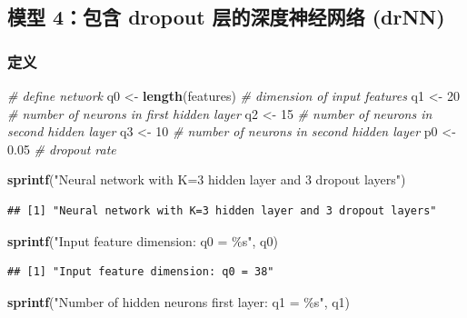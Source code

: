 \documentclass[
]{article}
\newenvironment{Shaded}{\begin{snugshade}}{\end{snugshade}}
\newcommand{\CommentTok}[1]{\textcolor[rgb]{0.56,0.35,0.01}{\textit{#1}}}
\newcommand{\DecValTok}[1]{\textcolor[rgb]{0.00,0.00,0.81}{#1}}
\newcommand{\FloatTok}[1]{\textcolor[rgb]{0.00,0.00,0.81}{#1}}
\newcommand{\FunctionTok}[1]{\textcolor[rgb]{0.13,0.29,0.53}{\textbf{#1}}}
\newcommand{\NormalTok}[1]{#1}
\newcommand{\OtherTok}[1]{\textcolor[rgb]{0.56,0.35,0.01}{#1}}
\newcommand{\StringTok}[1]{\textcolor[rgb]{0.31,0.60,0.02}{#1}}
\begin{document}
\subsection{模型 4：包含 dropout 层的深度神经网络
(drNN)}\label{ux6a21ux578b-4ux5305ux542b-dropout-ux5c42ux7684ux6df1ux5ea6ux795eux7ecfux7f51ux7edc-drnn}

\subsubsection{定义}\label{ux5b9aux4e49-3}

\begin{Shaded}
\begin{Highlighting}[]
\CommentTok{\# define network}
\NormalTok{q0 }\OtherTok{\textless{}{-}} \FunctionTok{length}\NormalTok{(features)  }\CommentTok{\# dimension of input features}
\NormalTok{q1 }\OtherTok{\textless{}{-}} \DecValTok{20}                \CommentTok{\# number of neurons in first hidden layer}
\NormalTok{q2 }\OtherTok{\textless{}{-}} \DecValTok{15}                \CommentTok{\# number of neurons in second hidden layer}
\NormalTok{q3 }\OtherTok{\textless{}{-}} \DecValTok{10}                \CommentTok{\# number of neurons in second hidden layer}
\NormalTok{p0 }\OtherTok{\textless{}{-}} \FloatTok{0.05}              \CommentTok{\# dropout rate     }

\FunctionTok{sprintf}\NormalTok{(}\StringTok{"Neural network with K=3 hidden layer and 3 dropout layers"}\NormalTok{)}
\end{Highlighting}
\end{Shaded}

\begin{verbatim}
## [1] "Neural network with K=3 hidden layer and 3 dropout layers"
\end{verbatim}

\begin{Shaded}
\begin{Highlighting}[]
\FunctionTok{sprintf}\NormalTok{(}\StringTok{"Input feature dimension: q0 = \%s"}\NormalTok{, q0)}
\end{Highlighting}
\end{Shaded}

\begin{verbatim}
## [1] "Input feature dimension: q0 = 38"
\end{verbatim}

\begin{Shaded}
\begin{Highlighting}[]
\FunctionTok{sprintf}\NormalTok{(}\StringTok{"Number of hidden neurons first layer: q1 = \%s"}\NormalTok{, q1)}
\end{Highlighting}
\end{Shaded}
\end{document}
